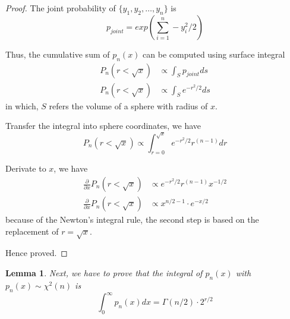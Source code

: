 \documentclass[a4paper]{article}
\newtheorem{lemma}{Lemma}[section]
\begin{document}
\begin{proof}
    The joint probability of $\{y_1, y_2, \dots, y_n\}$ is
    \begin{equation*}
        p_{joint} = exp(\sum_{i=1}^{n}-y_i^2/2)
    \end{equation*}

    Thus, the cumulative sum of $p_n(x)$ can be computed using surface integral
    \begin{equation*}
        \begin{align}
            P_n(r<\sqrt{x}) & \propto \int_{S} p_{joint} ds  \\
            P_n(r<\sqrt{x}) & \propto \int_{S} e^{-r^2/2} ds
        \end{align}
    \end{equation*}
    in which, $S$ refers the volume of a sphere with radius of $x$.

    Transfer the integral into sphere coordinates, we have
    \begin{equation*}
        P_n(r<\sqrt{x}) \propto \int_{r=0}^{\sqrt{x}} e^{-r^2/2} r^{(n-1)} dr
    \end{equation*}

    Derivate to $x$, we have
    \begin{equation*}
        \begin{align}
            \frac{\partial}{\partial{x}} {P_n(r<\sqrt{x})} & \propto e^{-r^2/2} r^{(n-1)} x^{-1/2} \\
            \frac{\partial}{\partial{x}} {P_n(r<\sqrt{x})} & \propto x^{n/2-1} \cdot e^{-x/2}
        \end{align}
    \end{equation*}
    because of the Newton's integral rule, the second step is based on the replacement of $r = \sqrt{x}$.

    Hence proved.

\end{proof}

\begin{lemma} \label{lemma: The pdf of Chi-squared distribution is a pdf}
    Next, we have to prove that the integral of $p_n(x)$ with $p_n(x) \sim \chi^2(n)$ is
    \begin{equation*}
        \int_0^\infty p_n(x) dx = \Gamma(n/2) \cdot 2^{r/2}
    \end{equation*}

\end{lemma}
\end{document}
